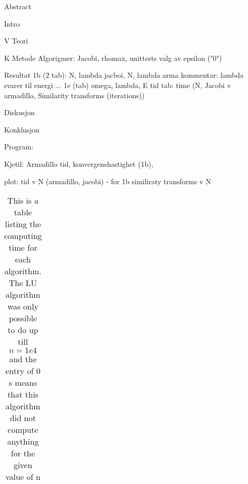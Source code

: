 

		Abstract

		Intro
		
V		Teori
						
			
K		Metode
			Algorigmer: Jacobi, rhomax, unittests
			valg av epsilon ("0")
			
		Resultat
			1b (2 tab): N, lambda jacboi,
							  N, lambda arma
					kommentar: lambda svarer til energi ... 
			1e	 (tab) omega, lambda, E
			tid
			tab: time (N, Jacobi v armadillo, 			Similarity transforms (iterations))

		Diskusjon

			
		Konklusjon
		
		

Program:

	Kjetil: Armadillo tid, konvergenshastighet (1b),
	
	plot: tid v N (armadillo, jacobi) - for 1b
	similiraty transforms v N
	
	
	
	
	\begin{table}[H]\caption{This is a table listing the computing time for each algorithm. The LU algorithm was only possible to do up till $ n=1e4 $ and the entry of 0 s means that this algorithm did not compute anything for the given value of n}
		\label{tab:time}
		\begin{tabular}{cccc}
			
		\end{tabular}
	\end{table}